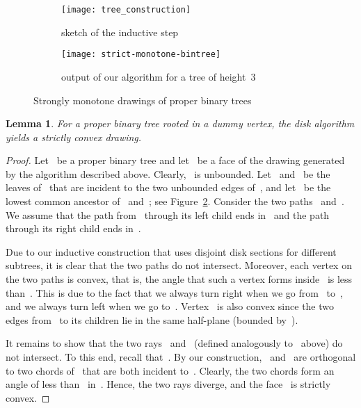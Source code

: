 \documentclass[a4paper,11pt]{article}
\theoremstyle{plain}
\newtheorem{lemma}{Lemma}
\begin{document}
\begin{figure}[tb]
  \begin{subfigure}[b]{.38\columnwidth}
    \centering
    \texttt{[image: tree\_construction]}
    \caption{sketch of the inductive step}
    \label{fig:construction-ind}
  \end{subfigure}
  \hfill
  \begin{subfigure}[b]{.58\columnwidth}
    \centering
    \texttt{[image: strict-monotone-bintree]}
    \caption{output of our algorithm for a tree of height~3}
    \label{fig:construction-final}
  \end{subfigure}
  \caption{Strongly monotone drawings of proper binary trees}
  \label{fig:construction}
\end{figure}

\begin{lemma}\label{lem:strict-conv-bintree-proof}
  For a proper binary tree rooted in a dummy vertex,
  the disk algorithm yields a strictly convex drawing.
\end{lemma}

\begin{proof}
  Let~ be a proper binary tree and let~ be a face of the
  drawing generated by the algorithm described above.  Clearly,~ is
  unbounded.  Let~ and~ be the leaves of~ that are incident
  to the two unbounded edges of~, and let~ be the lowest common
  ancestor of~ and~; see Figure~\ref{fig:construction-final}.
  Consider the two paths~ and~.  
  We assume that the path from~ through its left child
  ends in~ and the path through its right child ends in~.

  Due to our inductive construction that uses disjoint disk sections
  for different subtrees, it is clear that the two paths do not
  intersect.  Moreover, each vertex on the two paths is convex, that
  is, the angle that such a vertex forms inside~ is less
  than~.  This is due to the fact that we always turn right when
  we go from~ to~, and we always turn left when we go to~.
  Vertex~ is also convex since the two edges from~ to its
  children lie in the same half-plane (bounded by~).
  
  It remains to show that the two rays~ and~
  (defined analogously to~ above) do not intersect.  To this
  end, recall that~.  By our construction,~
  and~ are orthogonal to two chords of~ that are
  both incident to~.  Clearly, the two chords form an angle of
  less than~ in~.  Hence, the two rays diverge, and the
  face~ is strictly convex.
\end{proof}
  
\end{document}
